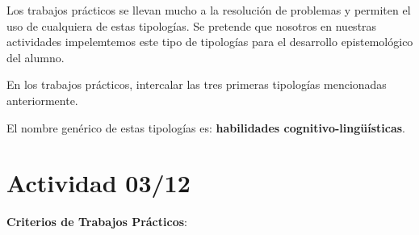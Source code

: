 \documentclass[12pt]{report}
\newcounter{it}
\theoremstyle{largebreak}
\begin{document}
    Los trabajos prácticos se llevan mucho a la resolución de problemas y permiten el uso de cualquiera de estas tipologías. Se pretende que nosotros en nuestras actividades impelemtemos este tipo de tipologías para el desarrollo epistemológico del alumno.

    \begin{excer}
        En los trabajos prácticos, intercalar las tres primeras tipologías mencionadas anteriormente.
    \end{excer}

    El nombre genérico de estas tipologías es: \textbf{habilidades cognitivo-lingüísticas}.

    \section{Actividad 03/12}

    \textbf{Criterios de Trabajos Prácticos}:
\end{document}
